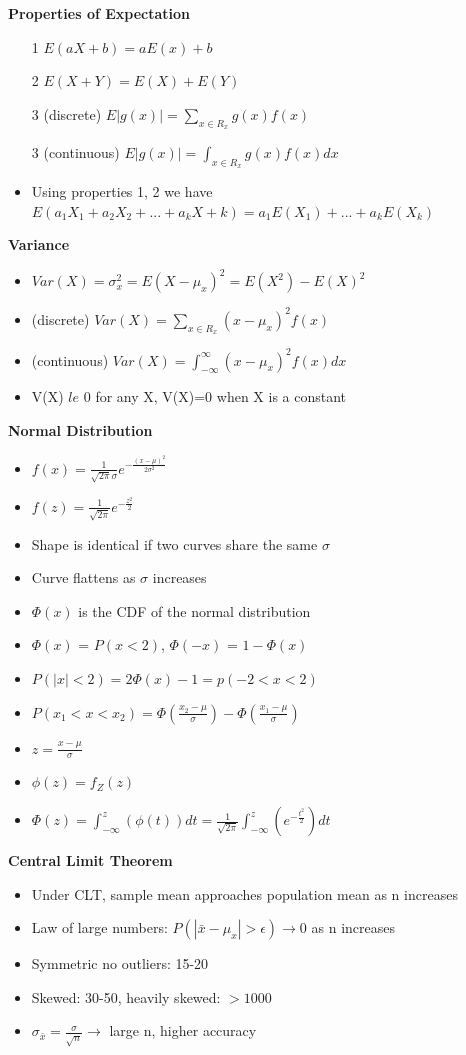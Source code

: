 \documentclass[10pt, landscape]{article}
\begin{document}
\begin{multicols}{4}
\textbf{Properties of Expectation}
\begin{itemize}
  \item[1] $E(aX+b)=aE(x)+b$
  \item[2] $E(X+Y)=E(X)+E(Y)$
  \item[3] (discrete) $E|g(x)|= \sum_{x \in R_x}g(x)f(x)$
  \item[3] (continuous) $E|g(x)|= \int_{x \in R_x}g(x)f(x)dx$
  \item Using properties 1, 2 we have $E(a_1X_1+a_2X_2+...+a_kX+k)=a_1E(X_1)+...+a_kE(X_k)$
\end{itemize}

\textbf{Variance} 
\begin{itemize}
  \item $Var(X)=\sigma_x^2=E(X-\mu_x)^2=E(X^2)-E(X)^2$
  \item (discrete) $Var(X)=\sum_{x \in R_x}(x-\mu_x)^2f(x)$
  \item (continuous) $Var(X)=\int_{-\infty}^{\infty}(x-\mu_x)^2f(x)dx$
  \item V(X) $le$ 0 for any X, V(X)=0 when X is a constant
\end{itemize}

\textbf{Normal Distribution} \newline
\begin{itemize}
  \item $f(x)=\frac{1}{\sqrt{2\pi}\sigma}e^{-\frac{(x-\mu)^2}{2\sigma^2}}$
  \item $f(z) = \frac{1}{\sqrt{2\pi}}e^{-\frac{z^2}{2}}$
  \item Shape is identical if two curves share the same $\sigma$
  \item Curve flattens as $\sigma$ increases
  \item $\Phi(x)$ is the CDF of the normal distribution
  \item $\Phi(x)$ = $P(x<2)$, $\Phi(-x)$ = $1-\Phi(x)$
  \item $P(|x|<2) = 2\Phi(x)-1 = p(-2<x<2)$
  \item $P(x_1<x<x_2)=\Phi(\frac{x_2-\mu}{\sigma})-\Phi(\frac{x_1-\mu}{\sigma})$
  \item $z=\frac{x-\mu}{\sigma}$
  \item $\phi(z)=f_Z(z)$
  \item $\Phi(z)=\int_{-\infty}^{z}(\phi(t))dt=\frac{1}{\sqrt{2\pi}}\int_{-\infty}^{z}(e^{-\frac{t^2}{2}})dt$
\end{itemize}

\textbf{Central Limit Theorem} \newline
\begin{itemize}
  \item Under CLT, sample mean approaches population mean as n increases
  \item Law of large numbers: $P(|\bar{x}-\mu_x|>\epsilon) \rightarrow 0$ as n increases
  \item Symmetric no outliers: 15-20
  \item Skewed: 30-50, heavily skewed: $>1000$
  \item $\sigma_{\bar{x}} = \frac{\sigma}{\sqrt{n}} \rightarrow$ large n, higher accuracy 
\end{itemize}



\end{multicols}
\end{document}
